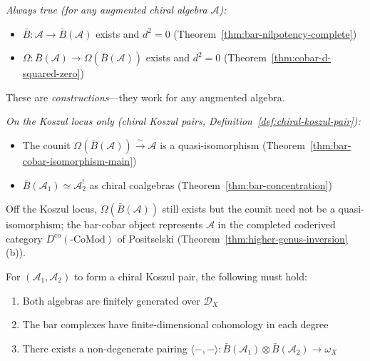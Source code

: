 \begin{remark}\label{rem:fundamental-distinction}
\emph{Always true (for any augmented chiral algebra $\mathcal{A}$):}
\begin{itemize}
\item $\bar{B}: \mathcal{A} \to \bar{B}(\mathcal{A})$ exists and $d^2 = 0$
  (Theorem~\ref{thm:bar-nilpotency-complete})
\item $\Omega: \bar{B}(\mathcal{A}) \to \Omega(\bar{B}(\mathcal{A}))$ exists
  and $d^2 = 0$
  (Theorem~\ref{thm:cobar-d-squared-zero})
\end{itemize}

These are \emph{constructions}---they work for any augmented algebra.

\emph{On the Koszul locus only
  \textup{(}chiral Koszul pairs,
  Definition~\textup{\ref{def:chiral-koszul-pair}):}}
\begin{itemize}
\item The counit $\Omega(\bar{B}(\mathcal{A})) \xrightarrow{\sim} \mathcal{A}$
  is a quasi-isomorphism (Theorem~\ref{thm:bar-cobar-isomorphism-main})
\item $\bar{B}(\mathcal{A}_1) \simeq \mathcal{A}_2^!$ as chiral coalgebras
  (Theorem~\ref{thm:bar-concentration})
\end{itemize}

Off the Koszul locus, $\Omega(\bar{B}(\mathcal{A}))$ still exists but
the counit need not be a quasi-isomorphism; the bar-cobar object
represents $\mathcal{A}$ in the completed coderived category
$D^{\mathrm{co}}(\text{-}\mathrm{CoMod})$ of Positselski
(Theorem~\ref{thm:higher-genus-inversion}(b)).
\end{remark}

\begin{theorem}\label{thm:koszul-necessary}
For $(\mathcal{A}_1, \mathcal{A}_2)$ to form a chiral Koszul pair, the following must hold:
\begin{enumerate}
\item Both algebras are finitely generated over $\mathcal{D}_X$
\item The bar complexes have finite-dimensional cohomology in each degree
\item There exists a non-degenerate pairing $\langle -, - \rangle: \bar{B}(\mathcal{A}_1) \otimes \bar{B}(\mathcal{A}_2) \to \omega_X$
\end{enumerate}
\end{theorem}

